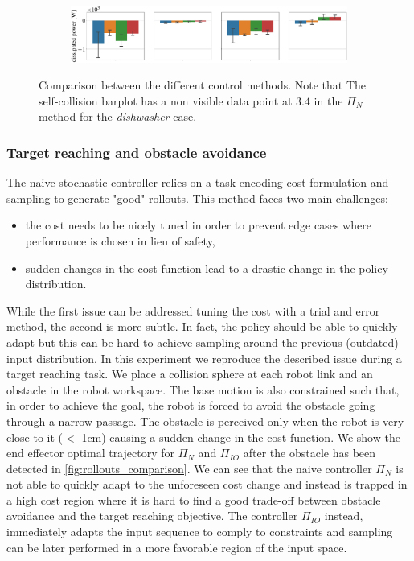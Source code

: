 \begin{figure}[t]
\begin{subfigure}{\columnwidth}
\end{subfigure} \label{fig:self_collision_violation}
\hspace*{-0.2cm} 
\vspace*{0.1cm}
\begin{subfigure}{\columnwidth}
    \includegraphics[width=\linewidth]{figures/methods_comparison/dissipated_power.pdf}
\end{subfigure}
\hfill
\caption{Comparison between the different control methods. Note that The self-collision barplot has a non visible data point at $3.4$ in the $\Pi_{N}$ method for the \textit{dishwasher} case.}\label{fig:methods_comparison}
\end{figure}

\vspace{0.3cm}
\subsubsection{Target reaching and obstacle avoidance}
The naive stochastic controller relies on a task-encoding cost formulation and sampling to generate "good" rollouts. This method faces two main challenges:
\begin{itemize}
    \item the cost needs to be nicely tuned in order to prevent edge cases where performance is chosen in lieu of safety,
    \item sudden changes in the cost function lead to a drastic change in the policy distribution.
\end{itemize}
While the first issue can be addressed tuning the cost with a trial and error method, the second is more subtle. In fact, the policy should be able to quickly adapt but this can be hard to achieve sampling around the previous (outdated) input distribution. In this experiment we reproduce the described issue during a target reaching task. We place a collision sphere at each robot link and an obstacle in the robot workspace. The base motion is also constrained such that, in order to achieve the goal, the robot is forced to avoid the obstacle going through a narrow passage. The obstacle is perceived only when the robot is very close to it ($<$ 1cm) causing a sudden change in the cost function. We show the end effector optimal trajectory for $\Pi_{N}$ and $\Pi_{IO}$ after the obstacle has been detected in \fig \ref{fig:rollouts_comparison}. We can see that the naive controller $\Pi_{N}$ is not able to quickly adapt to the unforeseen cost change and instead is trapped in a high cost region where it is hard to find a good trade-off between obstacle avoidance and the target reaching objective. The controller $\Pi_{IO}$ instead, immediately adapts the input sequence to comply to constraints and sampling can be later performed in a more favorable region of the input space.   


